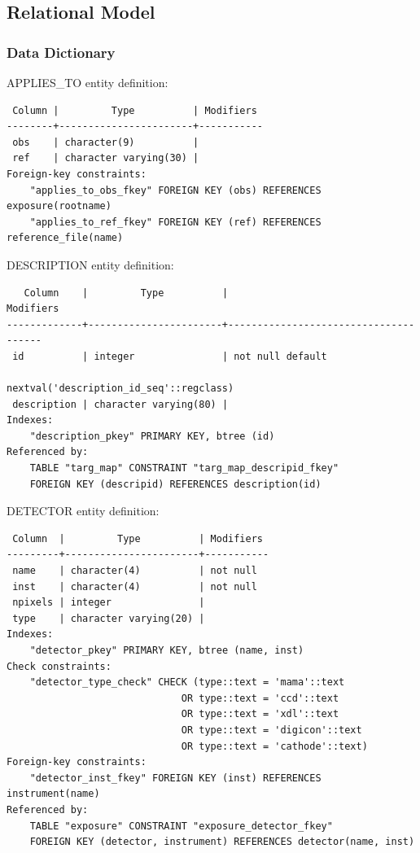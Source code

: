 \documentclass[a4paper,11pt]{article}
\begin{document}
\subsection{Relational Model}
\subsubsection{Data Dictionary}
\hrulefill
APPLIES\_TO entity definition:
\begin{verbatim}
 Column |         Type          | Modifiers 
--------+-----------------------+-----------
 obs    | character(9)          | 
 ref    | character varying(30) | 
Foreign-key constraints:
    "applies_to_obs_fkey" FOREIGN KEY (obs) REFERENCES exposure(rootname)
    "applies_to_ref_fkey" FOREIGN KEY (ref) REFERENCES reference_file(name)

\end{verbatim}

\hrulefill

DESCRIPTION entity definition:
\begin{verbatim}
   Column    |         Type          |                        Modifiers                         
-------------+-----------------------+--------------------------------------
 id          | integer               | not null default 
                                       nextval('description_id_seq'::regclass)
 description | character varying(80) | 
Indexes:
    "description_pkey" PRIMARY KEY, btree (id)
Referenced by:
    TABLE "targ_map" CONSTRAINT "targ_map_descripid_fkey" 
    FOREIGN KEY (descripid) REFERENCES description(id)

\end{verbatim}

\hrulefill

DETECTOR entity definition:
\begin{verbatim}
 Column  |         Type          | Modifiers 
---------+-----------------------+-----------
 name    | character(4)          | not null
 inst    | character(4)          | not null
 npixels | integer               | 
 type    | character varying(20) | 
Indexes:
    "detector_pkey" PRIMARY KEY, btree (name, inst)
Check constraints:
    "detector_type_check" CHECK (type::text = 'mama'::text 
                              OR type::text = 'ccd'::text 
                              OR type::text = 'xdl'::text 
                              OR type::text = 'digicon'::text 
                              OR type::text = 'cathode'::text)
Foreign-key constraints:
    "detector_inst_fkey" FOREIGN KEY (inst) REFERENCES instrument(name)
Referenced by:
    TABLE "exposure" CONSTRAINT "exposure_detector_fkey" 
    FOREIGN KEY (detector, instrument) REFERENCES detector(name, inst)

\end{verbatim}
\end{document}
